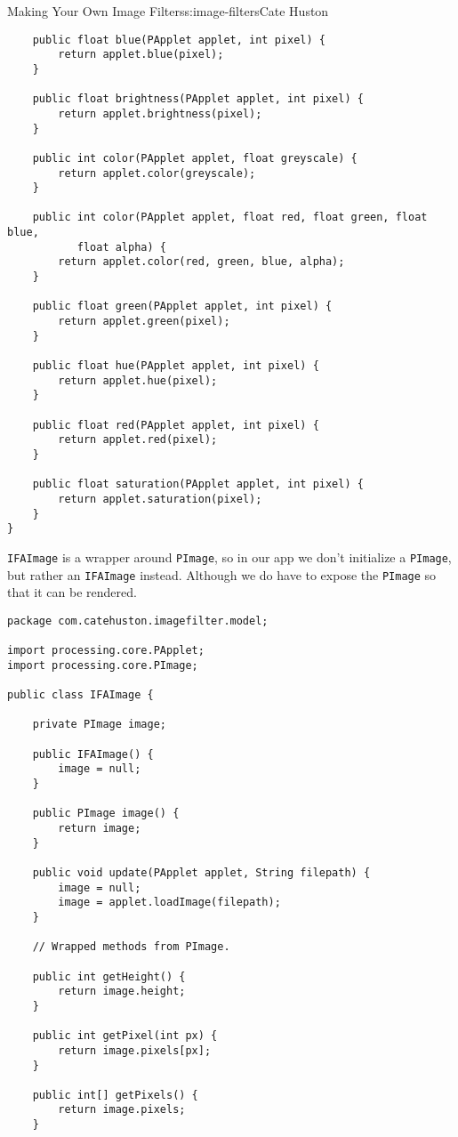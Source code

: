 \begin{aosachapter}{Making Your Own Image Filters}{s:image-filters}{Cate Huston}
\begin{verbatim}
    public float blue(PApplet applet, int pixel) {
        return applet.blue(pixel);
    }

    public float brightness(PApplet applet, int pixel) {
        return applet.brightness(pixel);
    }

    public int color(PApplet applet, float greyscale) {
        return applet.color(greyscale);
    }

    public int color(PApplet applet, float red, float green, float blue,
           float alpha) {
        return applet.color(red, green, blue, alpha);
    }

    public float green(PApplet applet, int pixel) {
        return applet.green(pixel);
    }

    public float hue(PApplet applet, int pixel) {
        return applet.hue(pixel);
    }

    public float red(PApplet applet, int pixel) {
        return applet.red(pixel);
    }

    public float saturation(PApplet applet, int pixel) {
        return applet.saturation(pixel);
    }
}
\end{verbatim}

\texttt{IFAImage} is a wrapper around \texttt{PImage}, so in our app we
don't initialize a \texttt{PImage}, but rather an \texttt{IFAImage}
instead. Although we do have to expose the \texttt{PImage} so that it
can be rendered.

\begin{verbatim}
package com.catehuston.imagefilter.model;

import processing.core.PApplet;
import processing.core.PImage;

public class IFAImage {

    private PImage image;

    public IFAImage() {
        image = null;
    }

    public PImage image() {
        return image;
    }

    public void update(PApplet applet, String filepath) {
        image = null;
        image = applet.loadImage(filepath);
    }

    // Wrapped methods from PImage.

    public int getHeight() {
        return image.height;
    }

    public int getPixel(int px) {
        return image.pixels[px];
    }

    public int[] getPixels() {
        return image.pixels;
    }


\end{verbatim}
\end{aosachapter}
